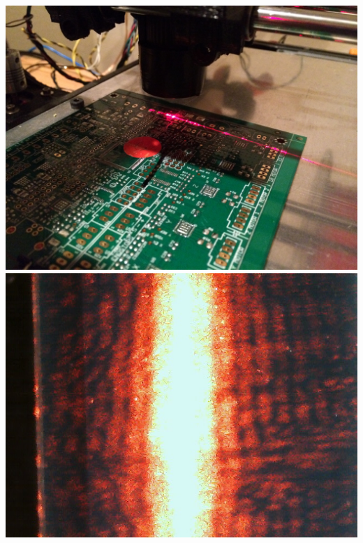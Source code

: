 \documentclass[12pt]{article}
\begin{document}
\includegraphics[scale=0.1]{images/volume_analysis_setup/IMG_0606.JPG}
\includegraphics{images/volume_analysis_setup/laser-8}
\end{document}
